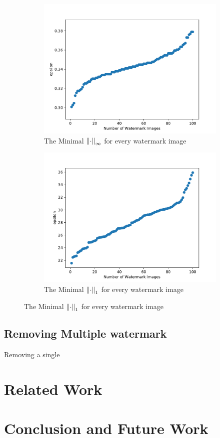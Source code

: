 \documentclass[a4paper]{llncs}
\begin{document}
\begin{figure}[h!]
\begin{subfigure}{0.4\linewidth}
    \includegraphics[width=\linewidth]{../data/results/problem1/mnist_w_wm_sorted.pdf}
     \caption{The Minimal $\left\lVert\cdot\right\rVert_{\infty}$ for every watermark image}
  \end{subfigure}
  \begin{subfigure}{0.4\linewidth}
    \includegraphics[width=\linewidth]{../data/results/problem2/mnist_w_wm_sorted.pdf}
    \caption{The Minimal $\left\lVert\cdot\right\rVert_1$ for every watermark image}
  \end{subfigure}
  \label{fig:minimalEpsilonSingle}
\end{figure}

\subsection{Removing Multiple watermark}

Removing a single 


\section{Related Work}
\label{sec:relatedWork}

\section{Conclusion and Future Work}
\label{sec:conclusion}




\end{document}
